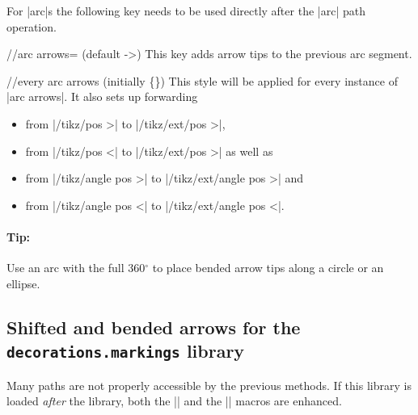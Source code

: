 \begin{multicols}{2}
For |arc|s the following key needs to be used directly after the |arc| path operation.
\begin{key}{/\tikzext/arc arrows= (default ->)}
This key adds arrow tips to the previous arc segment.
\begin{stylekey}{/\tikzext/every arc arrows (initially \{\})}
This style will be applied for every instance of |arc arrows|.
It also sets up forwarding
\begin{itemize}
  \item from |/tikz/pos >| to |/tikz/ext/pos >|,
  \item from |/tikz/pos <| to |/tikz/ext/pos >| as well as
  \item from |/tikz/angle pos >| to |/tikz/ext/angle pos >| and
  \item from |/tikz/angle pos <| to |/tikz/ext/angle pos <|.
\end{itemize}
\begin{codeexample}[preamble=\usetikzlibrary{ext.arrows-plus}]
\end{codeexample}
\end{stylekey}


\paragraph{Tip:}
Use an arc with the full 360${}^\circ$ to place bended arrow tips along a circle or an ellipse.
\end{key}
\subsection{Shifted and bended arrows for the \texttt{decorations.markings} library}
Many paths are not properly accessible by the previous methods.
If this library is loaded \emph{after}
the  library,
both the |\arrow| and
the |\arrowreversed| macros are enhanced.


\end{multicols}
